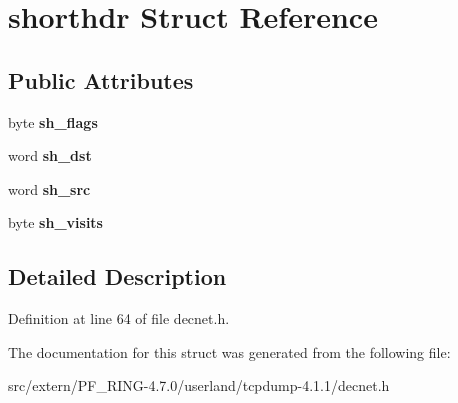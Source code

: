 \hypertarget{structshorthdr}{
\section{shorthdr Struct Reference}
\label{structshorthdr}
}
\subsection*{Public Attributes}
\begin{DoxyCompactItemize}
\item 
\hypertarget{structshorthdr_ab96904406e1ee516c4033df16e222f4b}{
byte {\bfseries sh\_\-flags}}
\label{structshorthdr_ab96904406e1ee516c4033df16e222f4b}

\item 
\hypertarget{structshorthdr_a28b5b023609ff89513acefa69a5b9ffe}{
word {\bfseries sh\_\-dst}}
\label{structshorthdr_a28b5b023609ff89513acefa69a5b9ffe}

\item 
\hypertarget{structshorthdr_aeed69b2287ef8faafc0632fed21ad2de}{
word {\bfseries sh\_\-src}}
\label{structshorthdr_aeed69b2287ef8faafc0632fed21ad2de}

\item 
\hypertarget{structshorthdr_a1774aa4c4a49e572bf25029b141fed3c}{
byte {\bfseries sh\_\-visits}}
\label{structshorthdr_a1774aa4c4a49e572bf25029b141fed3c}

\end{DoxyCompactItemize}


\subsection{Detailed Description}


Definition at line 64 of file decnet.h.



The documentation for this struct was generated from the following file:\begin{DoxyCompactItemize}
\item 
src/extern/PF\_\-RING-\/4.7.0/userland/tcpdump-\/4.1.1/decnet.h\end{DoxyCompactItemize}
